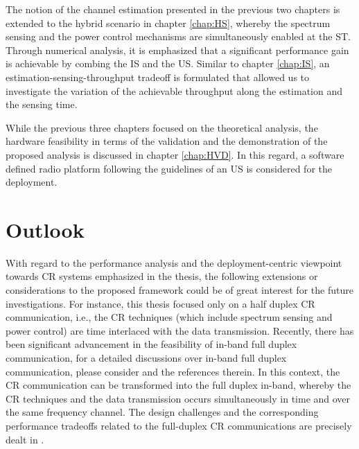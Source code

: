 The notion of the channel estimation presented in the previous two chapters is extended to the hybrid scenario in chapter \ref{chap:HS}, whereby the spectrum sensing and the power control mechanisms are simultaneously enabled at the ST. Through numerical analysis, it is emphasized that a significant performance gain is achievable by combing the IS and the US. Similar to chapter \ref{chap:IS}, an estimation-sensing-throughput tradeoff is formulated that allowed us to investigate the variation of the achievable throughput along the estimation and the sensing time. 

While the previous three chapters focused on the theoretical analysis, the hardware feasibility in terms of the validation and the demonstration of the proposed analysis is discussed in chapter \ref{chap:HVD}. In this regard, a software defined radio platform following the guidelines of an US is considered for the deployment. 


\section{Outlook}
With regard to the performance analysis and the deployment-centric viewpoint towards CR systems emphasized in the thesis, the following extensions or considerations to the proposed framework could be of great interest for the future investigations. For instance, this thesis focused only on a half duplex CR communication, i.e., the CR techniques (which include spectrum sensing and power control) are time interlaced with the data transmission. Recently, there has been significant advancement in the feasibility of in-band full duplex communication, for a detailed discussions over in-band full duplex communication, please consider \cite{Bhar13, Sab14, Liu15} and the references therein. In this context, the CR communication can be transformed into the full duplex in-band, whereby the CR techniques and the data transmission occurs simultaneously in time and over the same frequency channel. The design challenges and the corresponding performance tradeoffs related to the full-duplex CR communications are precisely dealt in \cite{Liao15, Kim15}. 

